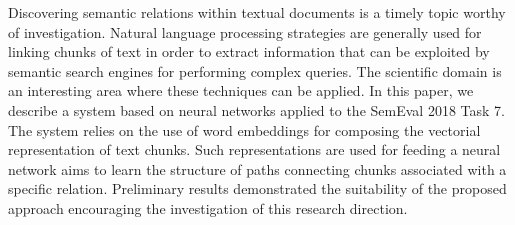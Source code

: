 Discovering semantic relations within textual documents is a timely topic worthy of investigation. Natural language processing strategies are generally used for linking chunks of text in order to extract information that can be exploited by semantic search engines for performing complex queries. The scientific domain is an interesting area where these techniques can be applied. In this paper, we describe a system based on neural networks applied to the SemEval 2018 Task 7. The system relies on the use of word embeddings for composing the vectorial representation of text chunks. Such representations are used for feeding a neural network aims to learn the structure of paths connecting chunks associated with a specific relation. Preliminary results demonstrated the suitability of the proposed approach encouraging the investigation of this research direction.
